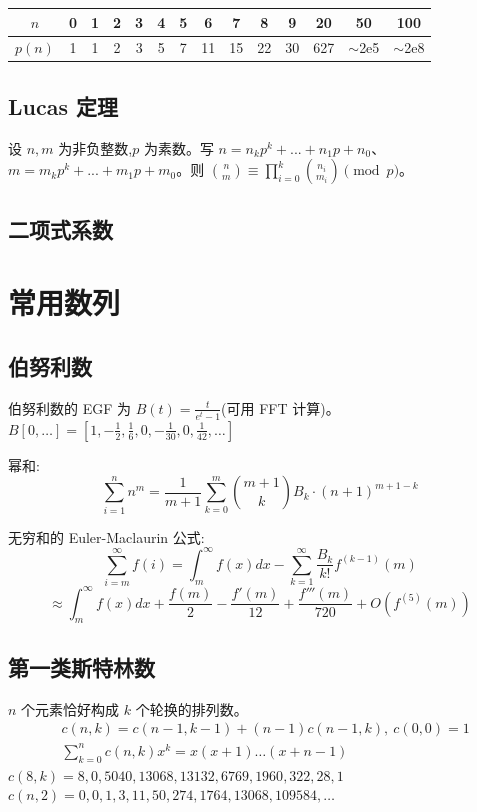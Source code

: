 		\begin{center}
		\begin{tabular}{c|c@{\ }c@{\ }c@{\ }c@{\ }c@{\ }c@{\ }c@{\ }c@{\ }c@{\ }c@{\ }c@{\ }c@{\ }c}
			$n$    & 0 & 1 & 2 & 3 & 4 & 5 & 6  & 7  & 8  & 9  & 20  & 50  & 100 \\ \hline
			$p(n)$ & 1 & 1 & 2 & 3 & 5 & 7 & 11 & 15 & 22 & 30 & 627 & $\mathtt{\sim}$2e5 & $\mathtt{\sim}$2e8 \\
		\end{tabular}
		\end{center}

	\subsection{Lucas 定理}
		设 $n,m$ 为非负整数,$p$ 为素数。写 $n=n_kp^k+...+n_1p+n_0$、$m=m_kp^k+...+m_1p+m_0$。则 $\binom{n}{m} \equiv \prod_{i=0}^k\binom{n_i}{m_i} \pmod{p}$。

	\subsection{二项式系数}

\section{常用数列}
	\subsection{伯努利数}
		伯努利数的 EGF 为 $B(t)=\frac{t}{e^t-1}$(可用 FFT 计算)。
		$B[0,\ldots] = [1, -\frac{1}{2}, \frac{1}{6}, 0, -\frac{1}{30}, 0, \frac{1}{42}, \ldots]$

		幂和:
		\small
		\[ \sum_{i=1}^n n^m = \frac{1}{m+1} \sum_{k=0}^m \binom{m+1}{k} B_k \cdot (n+1)^{m+1-k} \]
		\normalsize

		无穷和的 Euler-Maclaurin 公式:
		\small
		\[ \sum_{i=m}^{\infty} f(i) = \int_m^\infty f(x) dx - \sum_{k=1}^\infty \frac{B_k}{k!}f^{(k-1)}(m) \]
		\[ \approx \int_{m}^\infty f(x)dx + \frac{f(m)}{2} - \frac{f'(m)}{12} + \frac{f'''(m)}{720} + O(f^{(5)}(m)) \]
		\normalsize

	\subsection{第一类斯特林数}
		$n$ 个元素恰好构成 $k$ 个轮换的排列数。
		\begin{align*}
			&c(n,k) = c(n-1,k-1) + (n-1) c(n-1,k),\ c(0,0) = 1 \\
			&\textstyle \sum_{k=0}^n c(n,k)x^k = x(x+1) \dots (x+n-1)
		\end{align*}
		$c(8,k) = 8, 0, 5040, 13068, 13132, 6769, 1960, 322, 28, 1$ \\
		$c(n,2) = 0, 0, 1, 3, 11, 50, 274, 1764, 13068, 109584, \dots$

